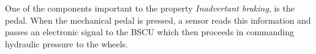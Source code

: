 


One of the components important to the property \textit{Inadvertant braking}, is the pedal. When the mechanical pedal is pressed, a sensor reads this information and passes an electronic signal to the BSCU which then proceeds in commanding hydraulic pressure to the wheels. 

